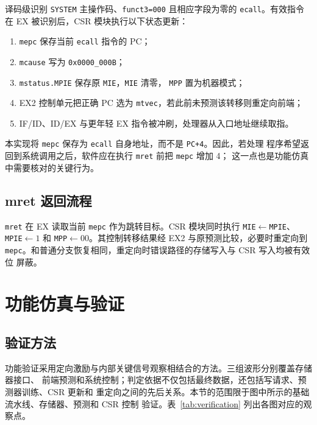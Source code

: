 \documentclass[UTF8,zihao=-4,a4paper]{ctexart}
\numberwithin{table}{section}
\numberwithin{figure}{section}
\newcommand{\code}[1]{\texttt{#1}}
\begin{document}
译码级识别 \code{SYSTEM} 主操作码、\code{funct3=000} 且相应字段为零的
\code{ecall}。有效指令在 EX 被识别后，CSR 模块执行以下状态更新：

\begin{enumerate}
  \item \code{mepc} 保存当前 \code{ecall} 指令的 PC；
  \item \code{mcause} 写为 \code{0x0000\_000B}；
  \item \code{mstatus.MPIE} 保存原 \code{MIE}，\code{MIE} 清零，
        \code{MPP} 置为机器模式；
  \item EX2 控制单元把正确 PC 选为 \code{mtvec}，若此前未预测该转移则重定向前端；
  \item IF/ID、ID/EX 与更年轻 EX 指令被冲刷，处理器从入口地址继续取指。
\end{enumerate}

本实现将 \code{mepc} 保存为 \code{ecall} 自身地址，而不是 \code{PC+4}。因此，若处理
程序希望返回到系统调用之后，软件应在执行 \code{mret} 前把 \code{mepc} 增加 4；
这一点也是功能仿真中需要核对的关键行为。

\subsection{mret 返回流程}

\code{mret} 在 EX 读取当前 \code{mepc} 作为跳转目标。CSR 模块同时执行
\code{MIE}\(\leftarrow\)\code{MPIE}、\code{MPIE}\(\leftarrow1\) 和
\code{MPP}\(\leftarrow00\)。其控制转移结果经 EX2 与原预测比较，必要时重定向到
\code{mepc}。和普通分支恢复相同，重定向时错误路径的存储写入与 CSR 写入均被有效位
屏蔽。

\section{功能仿真与验证}

\subsection{验证方法}

功能验证采用定向激励与内部关键信号观察相结合的方法。三组波形分别覆盖存储器接口、
前端预测和系统控制；判定依据不仅包括最终数据，还包括写请求、预测器训练、CSR 更新和
重定向之间的先后关系。本节的范围限于图中所示的基础流水线、存储器、预测和 CSR 控制
验证。表~\ref{tab:verification} 列出各图对应的观察点。
\end{document}
